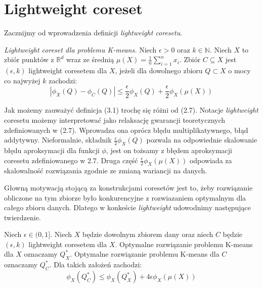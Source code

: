 \section{Lightweight coreset}

Zacznijmy od wprowadzenia definicji \textit{lightweight coresetu}.
\begin{definition}
    \emph{Lightweight coreset dla problemu K-means.} Niech $\epsilon > 0$ oraz $k \in \mathbb{N}$.
    Niech $X$ to zbiór punktów z $\mathbb{R}^{d}$ wraz ze średnią $\mu(X) = \frac{1}{n}\sum_{i=1}^{n} x_{i}$.
    Zbiór $C \subseteq X$ jest $(\epsilon, k)$ lightweight coresetem dla $X$, jeżeli dla dowolnego zbioru $Q \subset X$ o mocy co najwyżej $k$ zachodzi:
    \begin{equation}
        |\phi_{X}(Q) - \phi_{C}(Q)| \leq \frac{\epsilon}{2}\phi_{X}(Q) + \frac{\epsilon}{2}\phi_{X}(\mu(X))
    \end{equation}
\end{definition}

\noindent
Jak możemy zauważyć definicja (3.1) trochę się różni od (2.7).
Notacje \textit{lightweight} coresetu możemy interpretować jako relaksację gwarancji teoretycznych zdefiniowanych w (2.7).
Wprowadza ona oprócz błędu multiplikatywnego, błąd addytywny.
Nieformalnie, składnik $\frac{\epsilon}{2}\phi_{X}(Q)$ pozwala na odpowiednie skalowanie błędu aproksymacji dla funkcji $\phi$, jest on tożsamy z błędem aproksymacji coresetu zdefiniowanego w 2.7.
Druga część $\frac{\epsilon}{2}\phi_{X}(\mu(X))$ odpowiada za skalowalność rozwiązania zgodnie ze zmianą wariancji na danych.

Głowną motywacją stojącą za konstrukcjami coresetów jest to, żeby rozwiązanie obliczone na tym zbiorze było konkurencyjne z rozwiazaniem optymalnym dla całego zbioru danych.
Dlatego w konkeście \textit{lightweight} udowodnimy następujące twierdzenie.

\begin{thm}{\cite{bachem2017scalable}}
    Niech $\epsilon \in (0, 1]$. Niech $X$ będzie dowolnym zbiorem dany oraz niech $C$ będzie $(\epsilon, k)$ lightweight coresetem dla $X$.
    Optymalne rozwiązanie problemu K-means dla $X$ oznaczamy $Q_{X}^{*}$.
    Optymalne rozwiązanie problemu K-means dla $C$ oznaczamy $Q_{C}^{*}$.
    Dla takich założeń zachodzi:
    \begin{equation}
        \phi_{X}(Q_{C}^{*}) \leq \phi_{X}(Q_{X}^{*}) + 4\epsilon\phi_{X}(\mu(X))
    \end{equation}
\end{thm}

